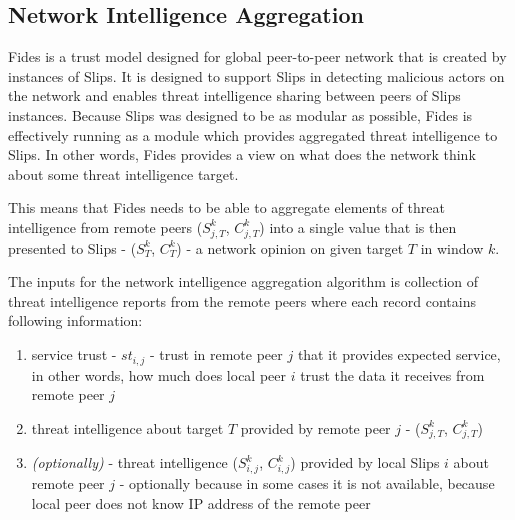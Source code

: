 \subsection{Network Intelligence Aggregation}
Fides is a trust model designed for global peer-to-peer network that is created by instances of Slips.
It is designed to support Slips in detecting malicious actors on the network and enables threat intelligence sharing between peers of Slips instances.
Because Slips was designed to be as modular as possible, Fides is effectively running as a module which provides aggregated threat intelligence to Slips. 
In other words, Fides provides a view on what does the network think about some threat intelligence target.

This means that Fides needs to be able to aggregate elements of threat intelligence from remote peers ($S^{k}_{j, T}$, $C^{k}_{j, T}$) into a single value that is then presented to Slips - ($S^{k}_{T}$, $C^{k}_{T}$) - a network opinion on given target $T$ in window $k$.
\vspace{5mm}

\noindent
The inputs for the network intelligence aggregation algorithm is collection of threat intelligence reports from the remote peers where each record contains following information:
\begin{enumerate}
\item service trust - $st_{i, j}$ - trust in remote peer $j$ that it provides expected service, in other words, how much does local peer $i$ trust the data it receives from remote peer $j$
\item threat intelligence about target $T$ provided by remote peer $j$ - ($S^{k}_{j, T}$, $C^{k}_{j, T}$)
\item \textit{(optionally)} - threat intelligence ($S^{k}_{i, j}$, $C^{k}_{i, j}$) provided by local Slips $i$ about remote peer $j$ - optionally because in some cases it is not available, because local peer does not know IP address of the remote peer
\end{enumerate}

